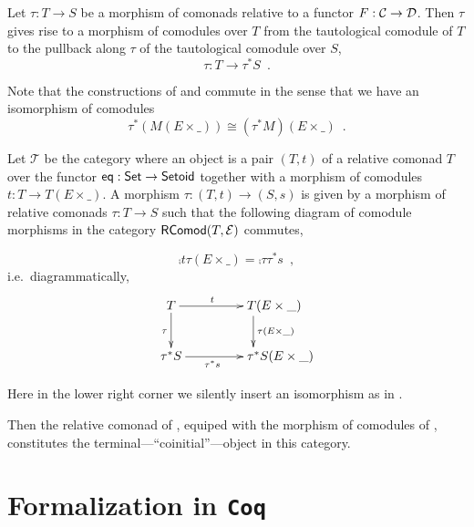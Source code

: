 \documentclass{amsart}
\begin{document}
\begin{definition}
  Let $\tau : T\to S$ be a morphism of comonads relative to a functor $F : {\mathcal{C}} \to \mathcal{D}$.
  Then $\tau$ gives rise to a morphism of comodules over $T$ from the tautological comodule
  of $T$ to the pullback along $\tau$ of the tautological comodule over $S$,
  \[ \tau : T \to \tau^*S \enspace . \]
\end{definition}


\begin{remark}\label{rem:prod_pullback_commute}
 Note that the constructions of  and  commute in the sense that
 we have an isomorphism of comodules \[\tau^*(M(E\times \_)) \cong (\tau^*M)(E \times \_) \enspace . \]
\end{remark}



\begin{theorem}\label{ex:final_sem_tri}
   Let $\mathcal{T}$ be the category where an object is a pair $(T,t)$ of a relative comonad $T$ over the functor
   $\mathsf{eq}: \mathsf{Set} \to \mathsf{Setoid}$ together with a morphism of comodules $t : T \to T(E \times \_)$.
   A morphism $\tau : (T,t) \to (S,s)$ is given by a morphism of relative comonads $\tau : T \to S$ such that
   the following diagram of comodule morphisms in the category $\mathsf{RComod}(T,\mathcal{E})$ commutes,
   
   \[     \comp{t}{\tau(E\times \_)} = \comp{\tau}{\tau^*s} \enspace , \]
   i.e.\, diagrammatically,   
   \[ \begin{xy}
       \xymatrix{   T  \ar[r]^t \ar[d]_{\tau}  &  **[r]T (E\times \_ )\ar[d]^{\tau(E\times \_)} \\
                    \tau^*S  \ar[r]_{\tau^*s}  &  **[r] \tau^*S (E\times \_ )
        }
      \end{xy}
   \]

   \noindent
   Here in the lower right corner we silently insert an isomorphism as in .
   
   Then the relative comonad of , equiped with the morphism of comodules of ,
   constitutes the terminal---\enquote{coinitial}---object in this category.
   
\end{theorem}

\section{Formalization in \texttt{Coq}}
\end{document}
